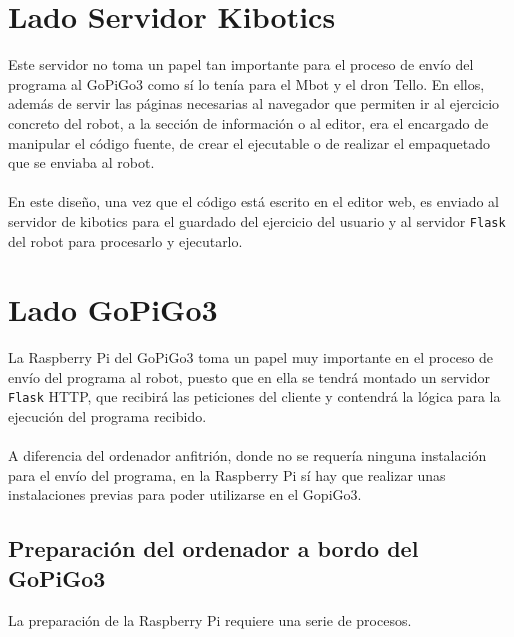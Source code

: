 \section{Lado Servidor Kibotics}

Este servidor no toma un papel tan importante para el proceso de envío del programa al GoPiGo3 como sí lo tenía para el Mbot y el dron Tello. En ellos, además de servir las páginas necesarias al navegador que permiten ir al ejercicio concreto del robot, a la sección de información o al editor, era el encargado de manipular el código fuente, de crear el ejecutable o de realizar el empaquetado que se enviaba al robot.
\\
\\
En este diseño, una vez que el código está escrito en el editor web, es enviado al servidor de kibotics para el guardado del ejercicio del usuario y al servidor \texttt{Flask} del robot para procesarlo y ejecutarlo. 

\section{Lado GoPiGo3}

La Raspberry Pi del GoPiGo3 toma un papel muy importante en el proceso de envío del programa al robot, puesto que en ella se tendrá montado un servidor \texttt{Flask} HTTP, que recibirá las peticiones del cliente y contendrá la lógica para la ejecución del programa recibido.
\\
\\
A diferencia del ordenador anfitrión, donde no se requería ninguna instalación para el envío del programa, en la Raspberry Pi sí hay que realizar unas instalaciones previas para poder utilizarse en el GopiGo3.

\subsection{Preparación del ordenador a bordo del GoPiGo3}

La preparación de la Raspberry Pi requiere una serie de procesos.

